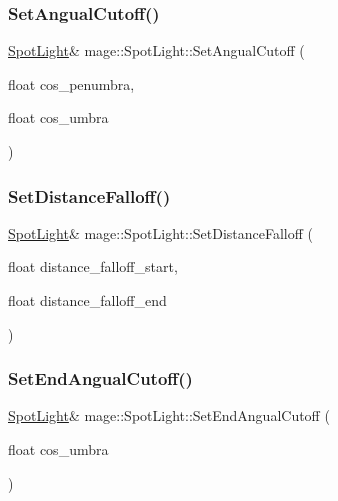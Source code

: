 \hypertarget{classmage_1_1_spot_light_a128e9e0b9a720f92d16ddd6ca4c31d18}{}\label{classmage_1_1_spot_light_a128e9e0b9a720f92d16ddd6ca4c31d18} 
\subsubsection{\texorpdfstring{Set\+Angual\+Cutoff()}{SetAngualCutoff()}}
{\footnotesize\ttfamily \hyperlink{classmage_1_1_spot_light}{Spot\+Light}\& mage\+::\+Spot\+Light\+::\+Set\+Angual\+Cutoff (\begin{DoxyParamCaption}\item[{float}]{cos\+\_\+penumbra,  }\item[{float}]{cos\+\_\+umbra }\end{DoxyParamCaption})}

\hypertarget{classmage_1_1_spot_light_a7321dc4bef165fbaaf9cf4b5781bc00f}{}\label{classmage_1_1_spot_light_a7321dc4bef165fbaaf9cf4b5781bc00f} 
\subsubsection{\texorpdfstring{Set\+Distance\+Falloff()}{SetDistanceFalloff()}}
{\footnotesize\ttfamily \hyperlink{classmage_1_1_spot_light}{Spot\+Light}\& mage\+::\+Spot\+Light\+::\+Set\+Distance\+Falloff (\begin{DoxyParamCaption}\item[{float}]{distance\+\_\+falloff\+\_\+start,  }\item[{float}]{distance\+\_\+falloff\+\_\+end }\end{DoxyParamCaption})}

\hypertarget{classmage_1_1_spot_light_ae89a7a3cdc11ed0f9d2aa825fcf0a07a}{}\label{classmage_1_1_spot_light_ae89a7a3cdc11ed0f9d2aa825fcf0a07a} 
\subsubsection{\texorpdfstring{Set\+End\+Angual\+Cutoff()}{SetEndAngualCutoff()}}
{\footnotesize\ttfamily \hyperlink{classmage_1_1_spot_light}{Spot\+Light}\& mage\+::\+Spot\+Light\+::\+Set\+End\+Angual\+Cutoff (\begin{DoxyParamCaption}\item[{float}]{cos\+\_\+umbra }\end{DoxyParamCaption})}

